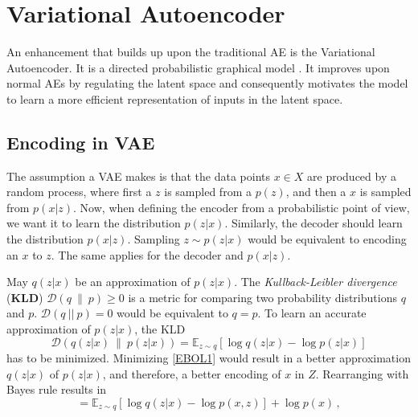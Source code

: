 \documentclass[a4paper]{IEEEtran}
\begin{document}
\section{Variational Autoencoder}
An enhancement that builds up upon the traditional AE is the Variational Autoencoder. It is a directed probabilistic graphical model \cite{kingma2014autoencoding}. It improves upon normal AEs by regulating the latent space and consequently motivates the model to learn a more efficient representation of inputs in the latent space.

\subsection{Encoding in VAE}
The assumption a VAE makes is that the data points $x \in X$ are produced by a random process, where first a $z$ is sampled from a $p(z)$, and then a $x$ is sampled from $p(x|z)$. Now, when defining the encoder from a probabilistic point of view, we want it to learn the distribution $p(z|x)$. Similarly, the decoder should learn the distribution $p(x|z)$. Sampling $z \sim p(z|x)$ would be equivalent to encoding an $x$ to $z$. The same applies for the decoder and $p(x|z)$.

May $q(z|x)$ be an approximation of $p(z|x)$. The 
\textit{Kullback-Leibler divergence} (\textbf{KLD}) $\mathcal{D}(q \ \| \ p) \geq 0$ is a metric for comparing two probability distributions $q$ and $p$. $\mathcal{D}(q \ || \ p) = 0$ would be equivalent to $q = p$. To learn an accurate approximation of $p(z|x)$, the KLD
\begin{equation}
	\mathcal{D}\left(q(z|x) \ \| \ p(z|x) \right) = \mathbb{E}_{z \sim q}\left[ \log q(z|x) - \log p(z|x) \right]
	\label{EBOL1}
\end{equation}
has to be minimized. Minimizing \eqref{EBOL1} would result in a better approximation $q(z|x)$ of $p(z|x)$, and therefore, a better encoding of $x$ in $Z$. Rearranging with Bayes rule results in
\begin{equation}
	= \mathbb{E}_{z \sim q} \left[ \log q(z|x) - \log p(x,z) \right] + \log p(x)\,,
	\label{EBOL2}
\end{equation}
\end{document}
